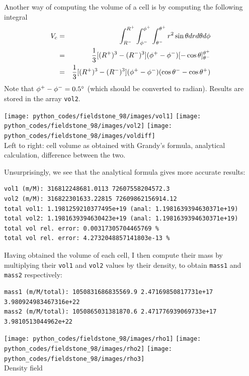 Another way of computing the volume of a cell is by computing the following integral
\begin{eqnarray}
V_c 
&=& \int_{R^-}^{R^+} \int_{\phi^-}^{\phi^+} \int_{\theta^-}^{\theta^+} r^2 \sin \theta dr d\theta d\phi \nonumber\\
&=& \frac{1}{3}[(R^+)^3-(R^-)^3] (\phi^+-\phi^-) [-\cos\theta]_{\theta^-}^{\theta^+} \nonumber\\
&=& \frac{1}{3}[(R^+)^3-(R^-)^3] (\phi^+-\phi^-) (\cos\theta^- -\cos\theta^+ )
\end{eqnarray}
Note that $\phi^+-\phi^- = 0.5\degree$ (which should be converted to radian). 
Results are stored in the array {\tt vol2}.

\begin{center}
\texttt{[image: python\_codes/fieldstone\_98/images/vol1]}
\texttt{[image: python\_codes/fieldstone\_98/images/vol2]}
\texttt{[image: python\_codes/fieldstone\_98/images/voldiff]}\\
{\captionfont Left to right: cell volume as obtained with Grandy's formula, 
analytical calculation, difference between the two.}
\end{center}

Unsurprisingly, we see that the analytical formula gives more accurate results:
\begin{verbatim}
vol1 (m/M): 316812248681.0113 72607558204572.3
vol2 (m/M): 316822301633.22815 72609862156914.12
total vol1: 1.1981259210377495e+19 (anal: 1.1981639394630371e+19)
total vol2: 1.1981639394630423e+19 (anal: 1.1981639394630371e+19)
total vol rel. error: 0.00317305704465769 %
total vol rel. error: 4.2732048857141803e-13 %
\end{verbatim}

Having obtained the volume of each cell, I then compute their mass by multiplying 
their {\tt vol1} and {\tt vol2} values by their density, to obtain 
{\tt mass1} and {\tt mass2} respectively:

\begin{verbatim}
mass1 (m/M/total): 1050831686835569.9 2.47169850817731e+17 3.980924983467316e+22
mass2 (m/M/total): 1050865031381870.6 2.471776939069733e+17 3.9810513044962e+22
\end{verbatim}


\begin{center}
\texttt{[image: python\_codes/fieldstone\_98/images/rho1]}
\texttt{[image: python\_codes/fieldstone\_98/images/rho2]}
\texttt{[image: python\_codes/fieldstone\_98/images/rho3]}\\
{\captionfont Density field}
\end{center}

